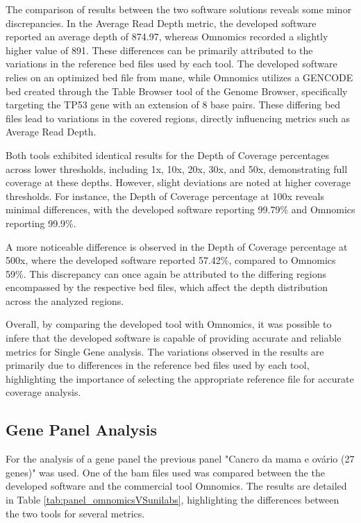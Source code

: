 The comparison of results between the two software solutions reveals some minor discrepancies. In the Average Read Depth metric, the developed software reported an average depth of 874.97, whereas Omnomics recorded a slightly higher value of 891. These differences can be primarily attributed to the variations in the reference \ac{bed} files used by each tool. The developed software relies on an optimized \ac{bed} file from \ac{mane}, while Omnomics utilizes a GENCODE \ac{bed} created through the Table Browser tool of the Genome Browser, specifically targeting the TP53 gene with an extension of 8 base pairs. These differing \ac{bed} files lead to variations in the covered regions, directly influencing metrics such as Average Read Depth.

Both tools exhibited identical results for the Depth of Coverage percentages across lower thresholds, including 1x, 10x, 20x, 30x, and 50x, demonstrating full coverage at these depths. However, slight deviations are noted at higher coverage thresholds. For instance, the Depth of Coverage percentage at 100x reveals minimal differences, with the developed software reporting 99.79\% and Omnomics reporting 99.9\%.

A more noticeable difference is observed in the Depth of Coverage percentage at 500x, where the developed software reported 57.42\%, compared to Omnomics 59\%. This discrepancy can once again be attributed to the differing regions encompassed by the respective \ac{bed} files, which affect the depth distribution across the analyzed regions.

Overall, by comparing the developed tool with Omnomics, it was possible to infere that the developed software is capable of providing accurate and reliable metrics for Single Gene analysis. The variations observed in the results are primarily due to differences in the reference \ac{bed} files used by each tool, highlighting the importance of selecting the appropriate reference file for accurate coverage analysis.

\subsection{Gene Panel Analysis}

For the analysis of a gene panel the previous panel "Cancro da mama e ovário (27 genes)" was used. One of the \ac{bam} files used was compared between the the developed software and the commercial tool Omnomics. The results are detailed in Table \ref{tab:panel_omnomicsVSunilabs}, highlighting the differences between the two tools for several metrics.

